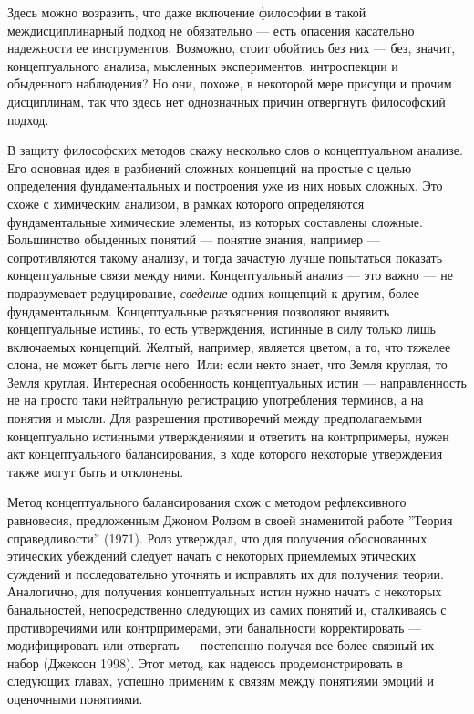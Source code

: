 \documentclass[11pt]{book}
\begin{document}
Здесь можно возразить, что даже включение философии в такой междисциплинарный подход не обязательно --- есть опасения касательно надежности ее инструментов. Возможно, стоит обойтись без них --- без, значит, концептуального анализа, мысленных экспериментов, интроспекции и обыденного наблюдения? Но они, похоже, в некоторой мере присущи и прочим дисциплинам, так что здесь нет однозначных причин отвергнуть философский подход.

В защиту философских методов скажу несколько слов о концептуальном анализе. Его основная идея в разбиений сложных концепций на простые с целью определения фундаментальных и построения уже из них новых сложных. Это схоже с химическим анализом, в рамках которого определяются фундаментальные химические элементы, из которых составлены сложные. Большинство обыденных понятий --- понятие знания, например --- сопротивляются такому анализу, и тогда зачастую лучше попытаться показать концептуальные связи между ними. Концептуальный анализ --- это важно --- не подразумевает редуцирование, \textit{сведение} одних концепций к другим, более фундаментальным. Концептуальные разъяснения позволяют выявить концептуальные истины, то есть утверждения, истинные в силу только лишь включаемых концепций. Желтый, например, является цветом, а то, что тяжелее слона, не может быть легче него. Или: если некто знает, что Земля круглая, то Земля круглая. Интересная особенность концептуальных истин --- направленность не на просто таки нейтральную регистрацию употребления терминов, а на понятия и мысли. Для разрешения противоречий между предполагаемыми концептуально истинными утверждениями и ответить на контрпримеры, нужен акт концептуального балансирования, в ходе которого некоторые утверждения также могут быть и отклонены.

Метод концептуального балансирования схож с методом рефлексивного равновесия, предложенным Джоном Ролзом в своей знаменитой работе ''Теория справедливости'' (1971). Ролз утверждал, что для получения обоснованных этических убеждений следует начать с некоторых приемлемых этических суждений и последовательно уточнять и исправлять их для получения теории. Аналогично, для получения концептуальных истин нужно начать с некоторых банальностей, непосредственно следующих из самих понятий и, сталкиваясь с противоречиями или контрпримерами, эти банальности корректировать --- модифицировать или отвергать --- постепенно получая все более связный их набор (Джексон 1998). Этот метод, как надеюсь продемонстрировать в следующих главах, успешно применим к связям между понятиями эмоций и оценочными понятиями.
\end{document}
